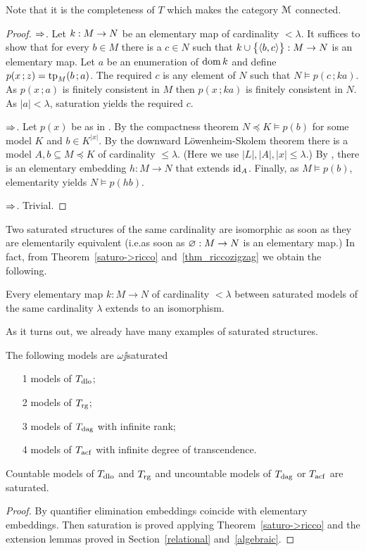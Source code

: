\documentclass[creche.tex]{subfiles}
\begin{document}
Note that it is the completeness of $T$ which makes the category $\EuScript M$ connected.

\begin{proof}
$\Rightarrow$. Let $k:M\rightarrow N$ be an elementary map of cardinality $<\lambda$. It suffices to show that for every $b\in M$ there is a $c\in N$ such that $k\cup\big\{\langle b,c\rangle\big\}:M\to N$ is an elementary map. Let $a$ be an enumeration of $\mathop{\rm dom} k$ and define $p(x\,;z)={\rm tp}_M(b\,;a)$. The required $c$ is any element of $N$ such that $N\models p(c\,;ka)$. As $p(x\,;a)$ is finitely consistent in $M$ then $p(x\,;ka)$ is finitely consistent in $N$. As $|a|<\lambda$, saturation yields the required $c$.

$\Rightarrow$. Let $p(x)$ be as in . By the compactness theorem $N\preceq K\models p(b)$ for some model $K$ and $b\in K^{|x|}$. By the downward  L\"owenheim-Skolem theorem there is a model $A,b\subseteq M\preceq K$ of cardinality $\le\lambda$. (Here we use $|L|,|A|,|x|\le\lambda$.) By , there is an elementary embedding $h:M\to N$ that extends $\textrm{id}_A$. Finally, as $M\models p(b)$,  elementarity yields $N\models p(hb)$.

$\Rightarrow$.  Trivial. 
\end{proof}

Two saturated structures of the same cardinality are isomorphic as soon as they are elementarily equivalent (i.e.\@ as soon as $\varnothing:M\to N$ is an elementary map.) In fact, from Theorem~\ref{saturo->ricco} and~\ref{thm_riccozigzag} we obtain the following.

\begin{corollary}
Every elementary map $k:M\to N$ of cardinality $<\lambda$ between saturated models of the same cardinality $\lambda$ extends to an isomorphism.\QED
\end{corollary}

As it turns out, we already have many examples of saturated structures.

\begin{corollary}
The following models are $\omega\jj$saturated
\begin{itemize}
\item[1] models of $T_{\rm dlo}$;
\item[2] models of $T_{\rm rg}$;
\item[3] models of $T_{\rm dag}$ with infinite rank;
\item[4] models of $T_{\rm acf}$ with infinite degree of transcendence.
\end{itemize}
Countable models of $T_{\rm dlo}$ and $T_{\rm rg}$ and uncountable models of $T_{\rm dag}$ or $T_{\rm acf}$ are saturated. 
\end{corollary}
\begin{proof}
By quantifier elimination embeddings coincide with elementary embeddings. Then saturation is proved applying Theorem~\ref{saturo->ricco} and the extension lemmas proved in Section~\ref{relational} and~\ref{algebraic}.
\end{proof}
\end{document}
